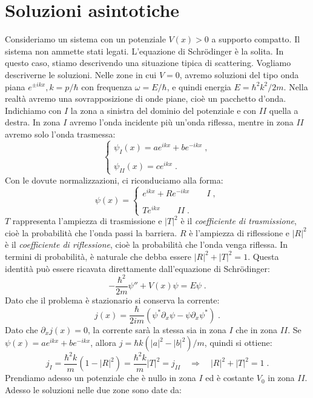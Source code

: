 \documentclass[10pt,a4paper]{report}
\theoremstyle{definition}
\numberwithin{equation}{section}
\newcommand{\Sch}{Schrödinger}
\begin{document}
\section{Soluzioni asintotiche}
Consideriamo un sistema con un potenziale $V(x)>0$ a supporto compatto. Il sistema non ammette stati legati. L'equazione di \Sch\; è la solita. In questo caso, stiamo descrivendo una situazione tipica di scattering. Vogliamo descriverne le soluzioni. Nelle zone in cui $V=0$, avremo soluzioni del tipo onda piana $e^{\pm ikx}, k=p/\hbar$ con frequenza $\omega=E/\hbar$, e quindi energia $E=\hbar^2k^2/2m$. Nella realtà avremo una sovrapposizione di onde piane, cioè un pacchetto d'onda. Indichiamo con $I$ la zona a sinistra del dominio del potenziale e con $II$ quella a destra. In zona $I$ avremo l'onda incidente più un'onda riflessa, mentre in zona $II$ avremo solo l'onda trasmessa:
\begin{equation*}
\begin{cases}
\psi_I(x)= ae^{ikx}+be^{-ikx}\;, \\
\\
\psi_{II}(x)=ce^{ikx}\;.
\end{cases}
\end{equation*}
Con le dovute normalizzazioni, ci riconduciamo alla forma:
\begin{equation}
\psi(x)=\begin{cases}
e^{ikx}+Re^{-ikx} \qquad I\;, \\
\\
Te^{ikx} \qquad II\;.
\end{cases}
\end{equation}
$T$ rappresenta l'ampiezza di trasmissione e $|T|^2$ è il \textit{coefficiente di trasmissione}, cioè la probabilità che l'onda passi la barriera. $R$ è l'ampiezza di riflessione e $|R|^2$ è il \textit{coefficiente di riflessione}, cioè la probabilità che l'onda venga riflessa. In termini di probabilità, è naturale che debba essere $|R|^2+|T|^2=1$. Questa identità può essere ricavata direttamente dall'equazione di \Sch:
$$
-\frac{\hbar^2}{2m}\psi''+V(x)\psi=E\psi\;.
$$
Dato che il problema è stazionario si conserva la corrente:
$$
j(x)=\frac{\hbar}{2im}(\psi^*\partial_x\psi-\psi\partial_x\psi^*)\;.
$$
Dato che $\partial_xj(x)=0$, la corrente sarà la stessa sia in zona $I$ che in zona $II$. Se $\psi(x)=ae^{ikx}+be^{-ikx}$, allora $j=\hbar k(|a|^2-|b|^2)/m$, quindi si ottiene:
$$
j_I=\frac{\hbar^2k}{m}(1-|R|^2)=\frac{\hbar^2 k}{m}|T|^2=j_{II} \quad \Longrightarrow \quad |R|^2+|T|^2=1\;.
$$
Prendiamo adesso un potenziale che è nullo in zona $I$ ed è costante $V_0$ in zona $II$. Adesso le soluzioni nelle due zone sono date da:
\end{document}
